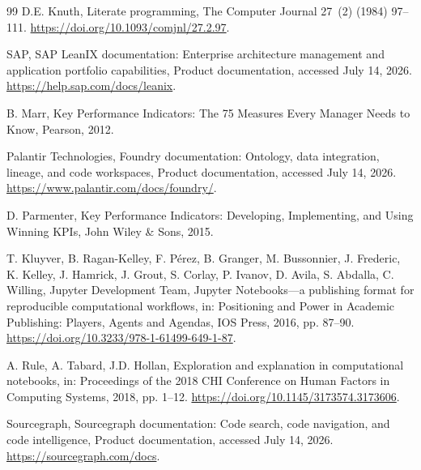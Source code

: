 \documentclass[a4paper,fleqn]{cas-dc}
\begin{document}
\begin{thebibliography}{99}
D.E. Knuth,
\newblock Literate programming,
\newblock The Computer Journal 27~(2) (1984) 97--111.
\newblock \url{https://doi.org/10.1093/comjnl/27.2.97}.

SAP,
\newblock SAP LeanIX documentation: Enterprise architecture management and application portfolio capabilities,
\newblock Product documentation, accessed July 14, 2026.
\newblock \url{https://help.sap.com/docs/leanix}.

B. Marr,
\newblock Key Performance Indicators: The 75 Measures Every Manager Needs to Know,
\newblock Pearson, 2012.

Palantir Technologies,
\newblock Foundry documentation: Ontology, data integration, lineage, and code workspaces,
\newblock Product documentation, accessed July 14, 2026.
\newblock \url{https://www.palantir.com/docs/foundry/}.

D. Parmenter,
\newblock Key Performance Indicators: Developing, Implementing, and Using Winning KPIs,
\newblock John Wiley \& Sons, 2015.

T. Kluyver, B. Ragan-Kelley, F. P\'erez, B. Granger, M. Bussonnier, J. Frederic, K. Kelley, J. Hamrick, J. Grout, S. Corlay, P. Ivanov, D. Avila, S. Abdalla, C. Willing, Jupyter Development Team,
\newblock Jupyter Notebooks---a publishing format for reproducible computational workflows,
\newblock in: Positioning and Power in Academic Publishing: Players, Agents and Agendas, IOS Press, 2016, pp. 87--90.
\newblock \url{https://doi.org/10.3233/978-1-61499-649-1-87}.

A. Rule, A. Tabard, J.D. Hollan,
\newblock Exploration and explanation in computational notebooks,
\newblock in: Proceedings of the 2018 CHI Conference on Human Factors in Computing Systems, 2018, pp. 1--12.
\newblock \url{https://doi.org/10.1145/3173574.3173606}.

Sourcegraph,
\newblock Sourcegraph documentation: Code search, code navigation, and code intelligence,
\newblock Product documentation, accessed July 14, 2026.
\newblock \url{https://sourcegraph.com/docs}.


\end{thebibliography}
\end{document}
